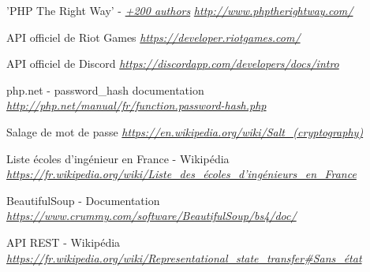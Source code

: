 \documentclass[10pt]{article}
\begin{document}
  \begin{thebibliography}{}
    
    \label{phpgoodpratices}
    'PHP The Right Way' - \href{https://github.com/codeguy/php-the-right-way/graphs/contributors}{\textit{+200 authors}} \newline
    \href{http://www.phptherightway.com/}{\textit{http://www.phptherightway.com/}}
    
    \label{riotapi}
    API officiel de Riot Games \newline
    \href{https://developer.riotgames.com/}{\textit{https://developer.riotgames.com/}}
    
    \label{discordapi}
    API officiel de Discord \newline
    \href{https://discordapp.com/developers/docs/intro}{\textit{https://discordapp.com/developers/docs/intro}}
    
    \label{password_hash}
    php.net - password\_hash documentation \newline
    \href{http://php.net/manual/fr/function.password-hash.php}{\textit{http://php.net/manual/fr/function.password-hash.php}}
    
    \label{password_salt}
    Salage de mot de passe \newline
    \href{https://en.wikipedia.org/wiki/Salt_(cryptography)}{\textit{https://en.wikipedia.org/wiki/Salt\_(cryptography)}}
    
    \label{ecole_ingé}
    Liste écoles d'ingénieur en France - Wikipédia \newline
    \href{https://fr.wikipedia.org/wiki/Liste_des_écoles_d'ingénieurs_en_France#Liste_des_207_écoles_françaises_accréditées_au_1er_septembre_2017}{\textit{https://fr.wikipedia.org/wiki/Liste\_des\_écoles\_d'ingénieurs\_en\_France}}
    
    \label{beautifulsoup}
    BeautifulSoup - Documentation\newline
    \href{https://www.crummy.com/software/BeautifulSoup/bs4/doc/}{\textit{https://www.crummy.com/software/BeautifulSoup/bs4/doc/}}
    
    \label{api_rest_session}
    API REST - Wikipédia \newline
    \href{https://fr.wikipedia.org/wiki/Representational_state_transfer#Sans_état}{\textit{https://fr.wikipedia.org/wiki/Representational\_state\_transfer\#Sans\_état}}
    
  \end{thebibliography}
  
\end{document}
